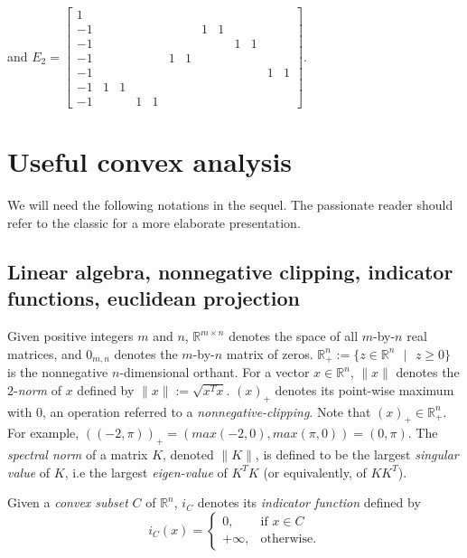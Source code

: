 \documentclass{article} %
\begin{document}
and $E_2 = \left[\begin{array}{ccccccccccccc}
1 &   &   &   &   &   &   &   &   &   &   &   &  \\
-1 &   &   &   &   &   &   & 1 & 1 &   &   &   &  \\
-1 &   &   &   &   &   &   &   &   & 1 & 1 &   &  \\
-1 &   &   &   &   & 1 & 1 &   &   &   &   &   &  \\
-1 &   &   &   &   &   &   &   &   &   &   & 1 & 1\\
-1 & 1 & 1 &   &   &   &   &   &   &   &   &   &  \\
-1 &   &   & 1 & 1 &   &   &   &   &   &   &   &  
\end{array}\right]$.\\


\section{Useful convex analysis}
\label{sec:notation}
We will need the following notations in the sequel. The passionate reader should refer to the classic \cite{rockafellar1997convex} for a more elaborate presentation.

\subsection{Linear algebra, nonnegative clipping, indicator functions, euclidean projection}
Given positive integers $m$ and $n$, $\mathbb{R}^{m \times n}$ denotes
the space of all $m$-by-$n$ real matrices, and $0_{m,n}$ denotes the $m$-by-$n$ matrix of zeros.
$\mathbb{R}^{n}_+ := \{z \in \mathbb{R}^{n}\text{ }|\text{ } z \geq 0\}$ is the nonnegative $n$-dimensional orthant.  For a vector $x \in \mathbb{R}^n$, $\|x\|$ denotes the $2$-\textit{norm} of $x$ defined by $\|x\| := \sqrt{x^Tx}$.
$(x)_+$ denotes its point-wise maximum with 0, an operation referred to a \textit{nonnegative-clipping}. Note that $(x)_+ \in \mathbb{R}^n_+$.
For example, $((-2, \pi))_+ = (max(-2, 0), max(\pi, 0)) = (0, \pi)$. The \textit{spectral norm} of a matrix $K$,
denoted $\|K\|$, is defined to be the largest \textit{singular value} of $K$, i.e the largest \textit{eigen-value} of $K^TK$ (or equivalently, of $KK^T$).

Given a \textit{convex subset} $C$ of $\mathbb{R}^n$, $i_C$ denotes its \textit{indicator function} defined by
\begin{equation}
  i_C(x) = \begin{cases}
    0, &\mbox{if } x \in C\\
    +\infty, &\mbox{otherwise}.
    \end{cases}
  \end{equation}
\end{document}
